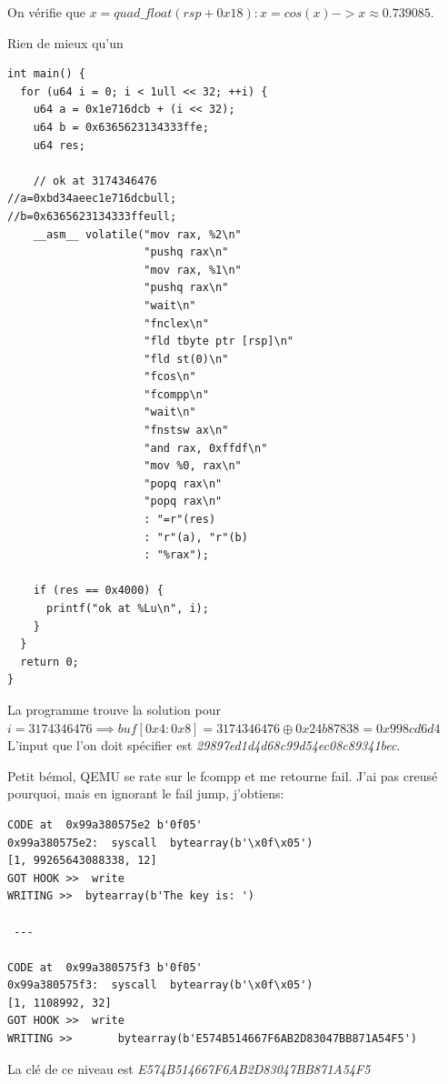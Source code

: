 \documentclass[14pt]{article}
\begin{document}
On vérifie que $x=quad\_float(rsp + 0x18) : x=cos(x) -> x\approx 0.739085$.


Rien de mieux qu'un
\begin{verbatim}
int main() {
  for (u64 i = 0; i < 1ull << 32; ++i) {
    u64 a = 0x1e716dcb + (i << 32);
    u64 b = 0x6365623134333ffe;
    u64 res;

    // ok at 3174346476
//a=0xbd34aeec1e716dcbull;
//b=0x6365623134333ffeull;
    __asm__ volatile("mov rax, %2\n"
                     "pushq rax\n"
                     "mov rax, %1\n"
                     "pushq rax\n"
                     "wait\n"
                     "fnclex\n"
                     "fld tbyte ptr [rsp]\n"
                     "fld st(0)\n"
                     "fcos\n"
                     "fcompp\n"
                     "wait\n"
                     "fnstsw ax\n"
                     "and rax, 0xffdf\n"
                     "mov %0, rax\n"
                     "popq rax\n"
                     "popq rax\n"
                     : "=r"(res)
                     : "r"(a), "r"(b)
                     : "%rax");

    if (res == 0x4000) {
      printf("ok at %Lu\n", i);
    }
  }
  return 0;
}
\end{verbatim}
La programme trouve la solution pour $i=3174346476 \implies buf[0x4:0x8]=3174346476 \oplus 0x24b87838=0x998cd6d4$
L'input que l'on doit spécifier est {\em 29897ed1d4d68c99d54ec08c89341bec}.

Petit bémol, QEMU se rate sur le fcompp et me retourne fail. J'ai pas creusé pourquoi, mais en ignorant le fail jump, j'obtiens:

\begin{verbatim}
CODE at  0x99a380575e2 b'0f05'
0x99a380575e2:	syscall	 bytearray(b'\x0f\x05')
[1, 99265643088338, 12]
GOT HOOK >>  write
WRITING >>  bytearray(b'The key is: ')

 ---

CODE at  0x99a380575f3 b'0f05'
0x99a380575f3:	syscall	 bytearray(b'\x0f\x05')
[1, 1108992, 32]
GOT HOOK >>  write
WRITING >>       bytearray(b'E574B514667F6AB2D83047BB871A54F5')
\end{verbatim}

La clé de ce niveau est {\em E574B514667F6AB2D83047BB871A54F5}
\end{document}
